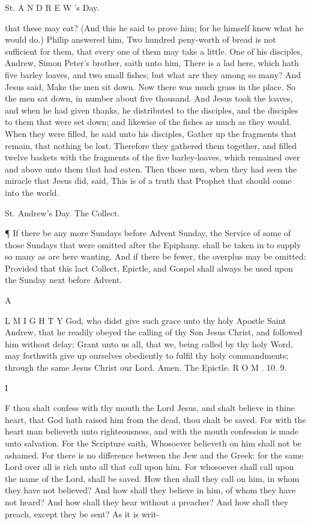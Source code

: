 St. A N D R E W ’s Day.

that these may eat? (And this he said to prove him; for he himself knew what he would do.) Philip answered him, Two hundred peny-worth of bread is not sufficient for them, that every one of them may take a little. One of his disciples, Andrew, Simon Peter’s brother, saith unto him, There is a lad here, which hath five barley loaves, and two small fishes; but what are they among so many? And Jesus said, Make the men sit down. Now there was much grass in the place. So the men sat down, in number about five thousand. And Jesus took the loaves, and when he had given thanks, he distributed to the disciples, and the disciples to them that were set down; and likewise of the fishes as much as they would. When they were filled, he said unto his disciples, Gather up the fragments that remain, that nothing be lost. Therefore they gathered them together, and filled twelve baskets with the fragments of the five barley-loaves, which remained over and above unto them that had eaten. Then those men, when they had seen the miracle that Jesus did, said, This is of a truth that Prophet that should come into the world.

St. Andrew’s Day. The Collect.

¶ If there be any more Sundays before Advent Sunday, the Service of some of those Sundays that were omitted after the Epiphany. shall be taken in to supply so many as are here wanting. And if there be fewer, the overplus may be omitted: Provided that this lact Collect, Epictle, and Gospel shall always be used upon the Sunday next before Advent.

A

L M I G H T Y God, who didst give such grace unto thy holy Apostle Saint Andrew, that he readily obeyed the calling of thy Son Jesus Christ, and followed him without delay; Grant unto us all, that we, being called by thy holy Word, may forthwith give up ourselves obediently to fulfil thy holy commandments; through the same Jesus Christ our Lord. Amen. The Epictle. R O M . 10. 9.

I

F thou shalt confess with thy mouth the Lord Jesus, and shalt believe in thine heart, that God hath raised him from the dead, thou shalt be saved. For with the heart man believeth unto righteousness, and with the mouth confession is made unto salvation. For the Scripture saith, Whosoever believeth on him shall not be ashamed. For there is no difference between the Jew and the Greek: for the same Lord over all is rich unto all that call upon him. For whosoever shall call upon the name of the Lord, shall be saved. How then shall they call on him, in whom they have not believed? And how shall they believe in him, of whom they have not heard? And how shall they hear without a preacher? And how shall they preach, except they be sent? As it is writ-

